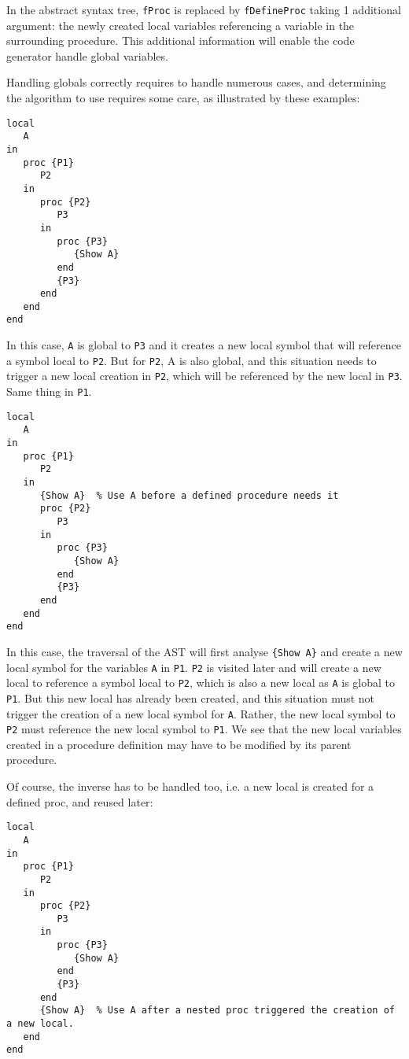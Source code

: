 \documentclass[a4paper]{memoir}
\begin{document}

In the abstract syntax tree, \lstinline!fProc! is replaced by \lstinline!fDefineProc! taking 1 additional argument: the newly created local variables referencing a variable in the surrounding procedure. This additional information will enable the code generator handle global variables.

Handling globals correctly requires to handle numerous cases, and determining the algorithm to use requires some care, as illustrated by these examples:

\begin{lstlisting}
local
   A
in
   proc {P1}
      P2
   in
      proc {P2}
         P3
      in
         proc {P3}
            {Show A}
         end
         {P3}
      end
   end
end
\end{lstlisting}
In this case, \lstinline!A! is global to \lstinline!P3! and it creates a new local symbol that will reference a symbol local to \lstinline!P2!. But for \lstinline!P2!, A is also global, and this situation needs to trigger a new local creation in \lstinline!P2!, which will be referenced by the new local in \lstinline!P3!. Same thing in \lstinline!P1!.

\begin{lstlisting}
local
   A
in
   proc {P1}
      P2
   in
      {Show A}  % Use A before a defined procedure needs it
      proc {P2}
         P3
      in
         proc {P3}
            {Show A}
         end
         {P3}
      end
   end
end
\end{lstlisting}

In this case, the traversal of the AST will first analyse \lstinline!{Show A}! and create a new local symbol for the variables \lstinline!A! in \lstinline!P1!. \lstinline!P2! is visited later and will create a new local to reference a symbol local to \lstinline!P2!, which is also a new local as \lstinline!A! is global to \lstinline!P1!. But this new local has already been created, and this situation must not trigger the creation of a new local symbol for \lstinline!A!. Rather, the new local symbol to \lstinline!P2! must reference the new local symbol to \lstinline!P1!. We see that the new local variables created in a procedure definition may have to be modified by its parent procedure.

Of course, the inverse has to be handled too, i.e. a new local is created for a defined proc, and reused later:

\begin{lstlisting}
local
   A
in
   proc {P1}
      P2
   in
      proc {P2}
         P3
      in
         proc {P3}
            {Show A}
         end
         {P3}
      end
      {Show A}  % Use A after a nested proc triggered the creation of a new local.
   end
end
\end{lstlisting}
\end{document}

